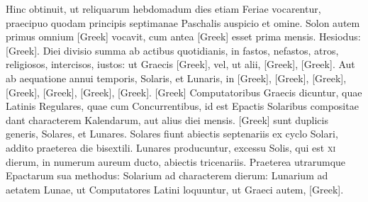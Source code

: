 Hinc obtinuit, ut reliquarum
hebdomadum dies etiam Feriae vocarentur, praecipuo quodam
principis septimanae Paschalis auspicio et omine.
Solon autem
primus omnium \textgreek{[Greek]} vocavit,
 cum antea \textgreek{[Greek]} esset
prima mensis.
Hesiodus: \textgreek{[Greek]}.
Diei divisio summa ab actibus quotidianis, in fastos, nefastos, atros,
religiosos, intercisos, iustos: ut Graecis
 \textgreek{[Greek]}, vel, ut alii,
\textgreek{[Greek]},
 \textgreek{[Greek]}.
Aut ab aequatione annui
temporis, Solaris, et Lunaris, in \textgreek{[Greek]},
 \textgreek{[Greek]}, \textgreek{[Greek]},
\textgreek{[Greek]}, \textgreek{[Greek]},
 \textgreek{[Greek]}, \textgreek{[Greek]}.
\textgreek{[Greek]} Computatoribus
Graecis dicuntur, quae Latinis Regulares, quae cum Concurrentibus,
id est Epactis Solaribus compositae dant characterem Kalendarum,
aut alius diei mensis.
\textgreek{[Greek]} sunt duplicis generis, Solares, et
Lunares.
Solares fiunt abiectis septenariis ex cyclo Solari, addito praeterea
die bisextili.
Lunares producuntur, excessu Solis, qui est \textsc{xi} dierum,
in numerum aureum ducto, abiectis tricenariis.
Praeterea utrarumque
Epactarum sua methodus: Solarium ad characterem dierum:
Lunarium ad aetatem Lunae, ut Computatores Latini loquuntur, ut
Graeci autem, \textgreek{[Greek]}.

